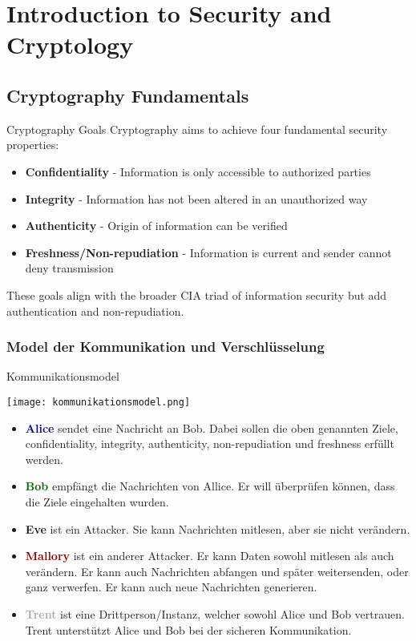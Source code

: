 \section{Introduction to Security and Cryptology}

\subsection{Cryptography Fundamentals}

\begin{definition}{Cryptography Goals}
    Cryptography aims to achieve four fundamental security properties:
    \begin{itemize}
        \item \textbf{Confidentiality} - Information is only accessible to authorized parties
        \item \textbf{Integrity} - Information has not been altered in an unauthorized way
        \item \textbf{Authenticity} - Origin of information can be verified
        \item \textbf{Freshness/Non-repudiation} - Information is current and sender cannot deny transmission
    \end{itemize}
    These goals align with the broader CIA triad of information security but add authentication and non-repudiation.
\end{definition}


\subsubsection{Model der Kommunikation und Verschlüsselung}

\begin{definition}{Kommunikationsmodel}

    \texttt{[image: kommunikationsmodel.png]}

    \begin{itemize}
        \item \textcolor{darkblue}{\textbf{Alice}} sendet eine Nachricht an Bob. Dabei sollen die oben genannten Ziele, confidentiality, integrity, authenticity, non-repudiation und freshness erfüllt werden.
        \item \textcolor{darkgreen}{\textbf{Bob}} empfängt die Nachrichten von Allice. Er will überprüfen können, dass die Ziele eingehalten wurden.
        \item \textcolor{darktangerine}{\textbf{Eve}}  ist ein Attacker. Sie kann Nachrichten mitlesen, aber sie nicht verändern.
        \item \textcolor{darkred}{\textbf{Mallory}} ist ein anderer Attacker. Er kann Daten sowohl mitlesen als auch verändern. Er kann auch Nachrichten abfangen und später weitersenden, oder ganz verwerfen. Er kann auch neue Nachrichten generieren.
        \item \textcolor{darkgrey}{\textbf{Trent}} ist eine Drittperson/Instanz, welcher sowohl Alice und Bob vertrauen. Trent unterstützt Alice und Bob bei der sicheren Kommunikation.
    \end{itemize}
\end{definition}


